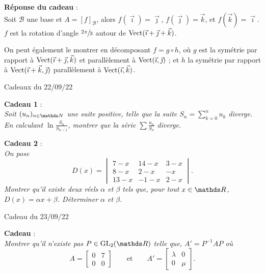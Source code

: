 \documentclass[a4paper]{article}
\begin{document}
	\upshape
	\bigskip
	\bigskip

	{\bf Réponse du cadeau} :\\
	Soit $\mathscr{B}$\/ une base et $A = [f]_\mathscr{B}$, alors $f(\vec\imath) = \vec\jmath$, $f(\vec\jmath) = \vec k$, et $f(\vec k) = \vec\imath$.
	$f$\/ est la rotation d'angle $\sfrac{2\pi}3$\/ autour de $\operatorname{Vect}(\vec \imath + \vec \jmath + \vec k)$.

	On peut également le montrer en décomposant $f = g  \circ h$, où $g$\/ est la symétrie par rapport à $\operatorname{Vect}(\vec{\imath}+\vec{\jmath},\vec{k})$\/ et parallèlement à $\operatorname{Vect}(\vec{\imath},\vec{\jmath})$\/ ; et $h$\/ la symétrie par rapport à $\operatorname{Vect}(\vec{\imath} + \vec{k},\vec{\jmath})$\/ parallèlement à $\operatorname{Vect}(\vec{\imath},\vec{k})$.

	\clearpage
	\centerline{\LARGE Cadeaux du 22/09/22}
	\bigskip
	\bigskip
	{\bf Cadeau 1} :\\
	\slshape
	Soit $(u_n)_{n\in\N}$\/ une suite positive, telle que la suite $S_n = \sum_{k=0}^n u_k$\/ diverge. En calculant $\ln \frac{S_n}{S_{n-1}}$, montrer que la série $\sum \frac{u_n}{S_n}$\/ diverge.
	\upshape

	\bigskip
	\bigskip
	
	\centerline{}

	\bigskip
	\bigskip
	
	{\bf Cadeau 2} :\\
	\slshape
	On pose \[
		D(x) = 
		\begin{vmatrix}
			7-x&14-x&3-x\\
			8-x&2-x&-x\\
			13-x&-1-x&2-x
		\end{vmatrix}
	.\]
	Montrer qu'il existe deux réels $\alpha$\/ et $\beta$\/ tels que, pour tout $x \in \R$, $D(x) = \alpha x + \beta$. Déterminer $\alpha$\/ et $\beta$.
	\clearpage
	\centerline{\LARGE Cadeau du 23/09/22}
	\bigskip
	\bigskip
	{\bf Cadeau} :\\
	\slshape
	Montrer qu'il n'existe pas $P \in \mathrm{GL}_2(\R)$\/ telle que, $A' = P^{-1}AP$\/ où \[
		A = \begin{bmatrix} 0&7\\0&0 \end{bmatrix}\qquad\text{et}\qquad
		A' = \begin{bmatrix} \lambda&0\\0&\mu \end{bmatrix}
	.\]
	\upshape
	\bigskip
	\bigskip
\end{document}
